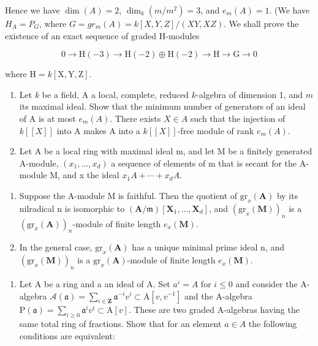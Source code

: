 Hence we have \(\dim(A) = 2\), \(\dim_k(m/m^2) = 3\), and \(e_m(A) = 1\). (We have \(H_A = P_G\), where \(G = gr_m(A) = k[X, Y, Z]/(XY, XZ)\). We shall prove the existence of an exact sequence of graded H-modules

\[
0 \rightarrow \mathrm{H} (- 3) \rightarrow \mathrm{H} (- 2) \oplus \mathrm{H} (- 2) \rightarrow \mathrm{H} \rightarrow \mathrm{G} \rightarrow 0
\]

\(\text{where } \mathrm{H} = k[\mathrm{X},\mathrm{Y},\mathrm{Z}].\)

\begin{enumerate}
\def\labelenumi{\arabic{enumi})}
\setcounter{enumi}{5}
\item
  Let \(k\) be a field, A a local, complete, reduced \(k\)-algebra of dimension 1, and \(m\) its maximal ideal. Show that the minimum number of generators of an ideal of A is at most \(e_m(A)\). There exists \(X \in A\) such that the injection of \(k[[X]]\) into A makes A into a \(k[[X]]\)-free module of rank \(e_m(A)\).
\item
  Let A be a local ring with maximal ideal m, and let M be a finitely generated A-module, \((x_{1}, \ldots, x_{d})\) a sequence of elements of m that is secant for the A-module M, and x the ideal \(x_{1}A + \cdots + x_{d}A\).
\end{enumerate}

\begin{enumerate}
\def\labelenumi{\alph{enumi})}
\tightlist
\item
  Suppose the A-module M is faithful. Then the quotient of \(\mathrm{gr}_{x}(\mathbf{A})\) by its nilradical n is isomorphic to \((\mathbf{A}/\mathfrak{m})[\mathbf{X}_{1}, \ldots, \mathbf{X}_{d}]\), and \((\mathrm{gr}_{x}(\mathbf{M}))_{n}\) is a \((\mathrm{gr}_{x}(\mathbf{A}))_{n}\)-module of finite length \(e_{x}(\mathbf{M})\).
\item
  In the general case, \(\mathrm{gr}_{x}(\mathbf{A})\) has a unique minimal prime ideal n, and \((\mathrm{gr}_{x}(\mathbf{M}))_{n}\) is a \(\mathrm{gr}_{x}(\mathbf{A})\)-module of finite length \(e_{x}(\mathbf{M})\).
\end{enumerate}

\begin{enumerate}
\def\labelenumi{\arabic{enumi})}
\setcounter{enumi}{7}
\tightlist
\item
  Let A be a ring and a an ideal of A. Set \(a^{i} = A\) for \(i \leqslant 0\) and consider the A-algebra \(\mathcal{A}(\mathfrak{a}) = \sum_{i \in \mathbf{Z}} \mathfrak{a}^{-i} v^{i} \subset \mathrm{A}[v, v^{-1}]\) and the A-algebra \(\mathrm{P}(\mathfrak{a}) = \sum_{i \geqslant 0} \mathfrak{a}^{i} v^{i} \subset \mathrm{A}[v]\). These are two graded A-algebras having the same total ring of fractions. Show that for an element \(a \in A\) the following conditions are equivalent:
\end{enumerate}

